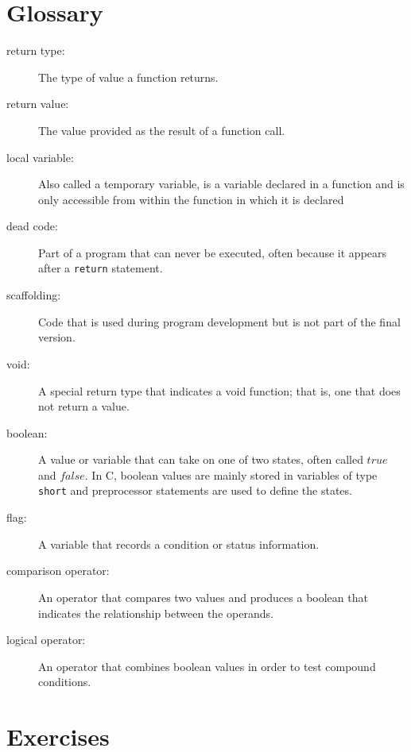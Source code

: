 
\section{Glossary}

\begin{description}

\item[return type:]  The type of value a function returns.

\item[return value:]  The value provided as the result of a function
call.

\item[local variable:]  Also called a temporary variable, is a variable declared in a function and is only accessible from within the function in which it is declared

\item[dead code:]  Part of a program that can never be executed,
often because it appears after a {\tt return} statement.

\item[scaffolding:]  Code that is used during program development
but is not part of the final version.

\item[void:]  A special return type that indicates a void function;
that is, one that does not return a value.

\item[boolean:]  A value or variable that can take on one of
two states, often called $true$ and $false$.  In C, boolean
values are mainly stored in variables of type {\tt short} and 
preprocessor statements are used to define the states.

\item[flag:]  A variable that records
a condition or status information.

\item[comparison operator:]  An operator that compares two values
and produces a boolean that indicates the relationship between the
operands.

\item[logical operator:]  An operator that combines boolean values
in order to test compound conditions.


\end{description}

\section{Exercises}
\setcounter{exercisenum}{0}




